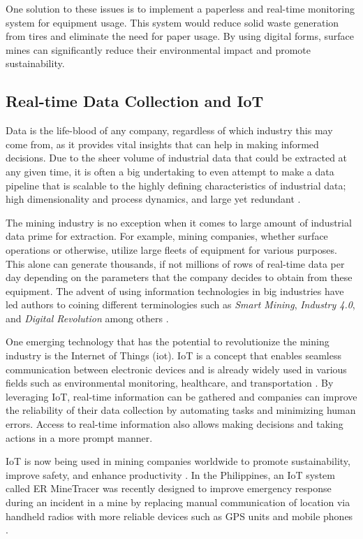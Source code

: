 \documentclass[12pt]{report}
\begin{document}
One solution to these issues is to implement a paperless and real-time monitoring system for equipment usage.
This system would reduce solid waste generation from tires and eliminate the need for paper usage.
By using digital forms, surface mines can significantly reduce their environmental impact and promote sustainability.

\subsection{Real-time Data Collection and IoT}

Data is the life-blood of any company, regardless of which industry this may come from, as it provides vital insights that can help in making informed decisions.
Due to the sheer volume of industrial data that could be extracted at any given time, it is often a big undertaking to even attempt to make a data pipeline that is scalable to the highly defining characteristics of industrial data; high dimensionality and process dynamics, and large yet redundant \cite{Urhan}.

The mining industry is no exception when it comes to large amount of industrial data prime for extraction.
For example, mining companies, whether surface operations or otherwise, utilize large fleets of equipment for various purposes.
This alone can generate thousands, if not millions of rows of real-time data per day depending on the parameters that the company decides to obtain from these equipment.
The advent of using information technologies in big industries have led authors to coining different terminologies such as \textit{Smart Mining}, \textit{Industry 4.0}, and \textit{Digital Revolution} among others \cite{SmartMining}.

One emerging technology that has the potential to revolutionize the mining industry is the Internet of Things (\Gls{iot}).
IoT is a concept that enables seamless communication between electronic devices and is already widely used in various fields such as environmental monitoring, healthcare, and transportation \cite{IoT}.
By leveraging IoT, real-time information can be gathered and companies can improve the reliability of their data collection by automating tasks and minimizing human errors.
Access to real-time information also allows making decisions and taking actions in a more prompt manner.

IoT is now being used in mining companies worldwide to promote sustainability, improve safety, and enhance productivity \cite{IoTinMining}.
In the Philippines, an IoT system called ER MineTracer was recently designed to improve emergency response during an incident in a mine by replacing manual communication of location via handheld radios with more reliable devices such as GPS units and mobile phones \cite{ERMineTracer}.
\end{document}
